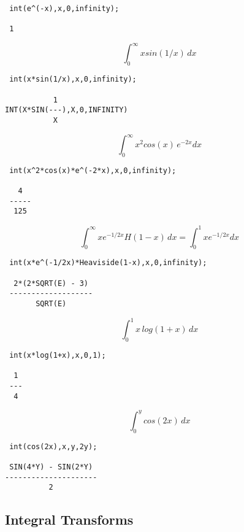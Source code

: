 \begin{verbatim}
 int(e^(-x),x,0,infinity);

 1
\end{verbatim}

\begin{displaymath}
\int_{0}^{\infty} x sin(1/x) \, dx
\end{displaymath}

\begin{verbatim}
 int(x*sin(1/x),x,0,infinity);

           1
INT(X*SIN(---),X,0,INFINITY)
           X
\end{verbatim}

\begin{displaymath}
\int_{0}^{\infty} x^2 cos(x) \, e^{-2x} dx
\end{displaymath}

\begin{verbatim}
 int(x^2*cos(x)*e^(-2*x),x,0,infinity);

   4
 -----
  125
\end{verbatim}

\begin{displaymath}
\int_{0}^{\infty} x e^{-1/2x} H(1-x) \,dx = \int_{0}^{1} x e^{-1/2x} dx
\end{displaymath}

\begin{verbatim}
 int(x*e^(-1/2x)*Heaviside(1-x),x,0,infinity);

  2*(2*SQRT(E) - 3)
 -------------------
       SQRT(E)
\end{verbatim}

\begin{displaymath}
\int_{0}^{1} x \,log(1+x) \,dx
\end{displaymath}

\begin{verbatim}
 int(x*log(1+x),x,0,1);

  1
 ---
  4
\end{verbatim}

\begin{displaymath}
\int_{0}^{y} cos(2x) \,dx
\end{displaymath}

\begin{verbatim}
 int(cos(2x),x,y,2y);

 SIN(4*Y) - SIN(2*Y)
---------------------
          2
\end{verbatim}


\subsection{Integral Transforms}

